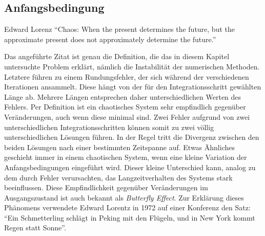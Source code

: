 \subsection{Anfangsbedingung}
\label{vanderpol:subsection:anfangsbedingung}
\begin{cquote}[30pt]{Edward Lorenz}
``Chaos: When the present determines the future, but the approximate present does not approximately determine the future.''\cite{vanderpol:biblorenz}
\end{cquote}
\noindent Das angeführte Zitat ist genau die Definition, die das in diesem Kapitel untersuchte Problem erklärt, nämlich die Instabilität der numerischen Methoden. Letztere führen zu einem Rundungsfehler, der sich während der verschiedenen Iterationen ansammelt. Diese hängt von der für den Integrationsschritt gewählten Länge ab. Mehrere Längen entsprechen daher unterschiedlichen Werten des Fehlers.
Per Definition ist ein chaotisches System sehr empfindlich gegenüber Veränderungen, auch wenn diese minimal sind. Zwei Fehler aufgrund von zwei unterschiedlichen Integrationsschritten können somit zu zwei völlig unterschiedlichen Lösungen führen. In der Regel tritt die Divergenz zwischen den beiden Lösungen nach einer bestimmten Zeitspanne auf. Etwas Ähnliches geschieht immer in einem chaotischen System, wenn eine kleine Variation der Anfangsbedingungen eingeführt wird. Dieser kleine Unterschied kann, analog zu dem durch Fehler verursachten, das Langzeitverhalten des Systems stark beeinflussen. Diese Empfindlichkeit gegenüber Veränderungen im Ausgangszustand ist auch bekannt als {\em Butterfly Effect}. Zur Erklärung dieses Phänomens verwendete Edward Lorentz in 1972 auf einer Konferenz den Satz: ``Ein Schmetterling schlägt in Peking mit den Flügeln, und in New York kommt Regen statt Sonne''.
